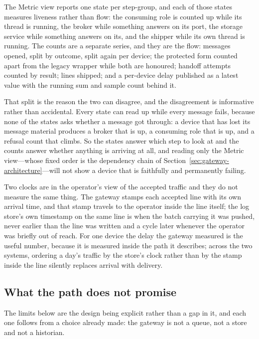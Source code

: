 \documentclass[12pt,a4paper]{report}
\begin{document}
The Metric view reports one state per step-group, and each of those
states measures liveness rather than flow: the consuming role is
counted up while its thread is running, the broker while something
answers on its port, the storage service while something answers on
its, and the shipper while its own thread is running. The counts are a
separate series, and they are the flow: messages opened, split by
outcome, split again per device; the protected form counted apart from
the legacy wrapper while both are honoured; handoff attempts counted by
result; lines shipped; and a per-device delay published as a latest
value with the running sum and sample count behind it.

That split is the reason the two can disagree, and the disagreement is
informative rather than accidental. Every state can read up while every
message fails, because none of the states asks whether a message got
through: a device that has lost its message material produces a broker
that is up, a consuming role that is up, and a refusal count that
climbs. So the states answer which step to look at and the counts
answer whether anything is arriving at all, and reading only the
Metric view---whose fixed order is the dependency chain of
Section~\ref{sec:gateway-architecture}---will not show a device that is
faithfully and permanently failing.

Two clocks are in the operator's view of the accepted traffic and they
do not measure the same thing. The gateway stamps each accepted line
with its own arrival time, and that stamp travels to the operator
inside the line itself; the log store's own timestamp on the same line
is when the batch carrying it was pushed, never earlier than the line
was written and a cycle later whenever the operator was briefly out of
reach.
For one device the delay the gateway measured is the useful number,
because it is measured inside the path it describes; across the two
systems, ordering a day's traffic by the store's clock rather than by
the stamp inside the line silently replaces arrival with delivery.

\subsection{What the path does not promise}
\label{sec:gw-in-guarantees}

The limits below are the design being explicit rather than a gap in
it, and each one follows from a choice already made: the gateway is not
a queue, not a store and not a historian.
\end{document}
